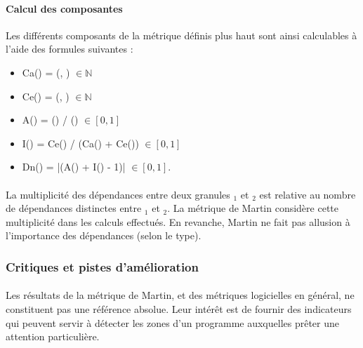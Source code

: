 \documentclass{scrartcl}
\begin{document}
    \paragraph{Calcul des composantes}Les différents composants de la métrique définis plus haut sont ainsi calculables à l'aide des formules suivantes : 
    \begin{itemize}
        \item Ca(\granule{}) = \dependantClasses{}(\granule{}, \granuleUniverse{}) $\in \mathbb{N}$
        
        \item Ce(\granule{}) = \dependedClasses{}(\granule{}, \granuleUniverse{}) $\in \mathbb{N}$
        
        \item A(\granule{}) = \numberOfabstractClass{}(\granule{}) /
        {\numberOfClass{}(\granule{})} $\in [0, 1]$

        \item I(\granule{}) = Ce(\granule{}) / (Ca(\granule{}) + Ce(\granule{})) $\in [0, 1]$
        
        \item Dn(\granule{}) = |(A(\granule{}) + I(\granule{}) - 1)| $\in [0, 1]$.
    \end{itemize}

    \paragraph{}La multiplicité des dépendances entre deux granules \granule{}$_1$ et \granule{}$_2$ est relative au nombre de dépendances distinctes entre \granule{}$_1$ et \granule{}$_2$. La métrique de Martin considère cette multiplicité dans les calculs effectués. En revanche, Martin ne fait pas allusion à l'importance des dépendances (selon le type).
    



\subsubsection{Critiques et pistes d'amélioration}

    \paragraph{}Les résultats de la métrique de Martin, et des métriques logicielles en général, ne constituent pas une référence absolue. Leur intérêt est de fournir des indicateurs qui peuvent servir à détecter les zones d'un programme auxquelles prêter une attention particulière.
    
\end{document}
